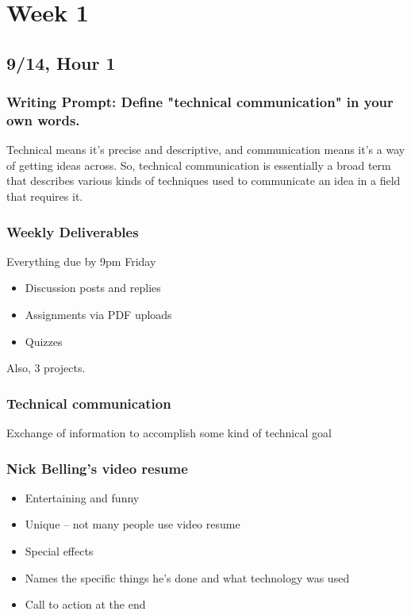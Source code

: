 \chapter{Week 1}

\section{9/14, Hour 1}

\subsection{Writing Prompt: Define "technical communication" in your own words.}

Technical means it's precise and descriptive, and communication means it's a way of getting ideas across. So, technical communication is essentially a broad term that describes various kinds of techniques used to communicate an idea in a field that requires it.
  
\subsection{Weekly Deliverables}

Everything due by 9pm Friday

\begin{itemize}
    \item Discussion posts and replies
    \item Assignments via PDF uploads
    \item Quizzes
\end{itemize}

Also, 3 projects.

\subsection{Technical communication}

\begin{outline}
    \1 Exchange of information to accomplish some kind of technical goal
\end{outline}

\subsection{Nick Belling's video resume}

\begin{itemize}
    \item Entertaining and funny
    \item Unique -- not many people use video resume
    \item Special effects
    \item Names the specific things he's done and what technology was used
    \item Call to action at the end
\end{itemize}

